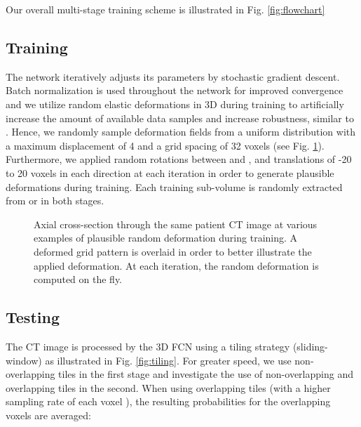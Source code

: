 \documentclass[authoryear]{elsarticle}
\begin{document}
\textcolor{revision}{Our overall multi-stage training scheme is illustrated in Fig. \ref{fig:flowchart}}
\begin{figure*}[htb] \centering
	\caption{\textcolor{revision}{Flowchart of our multi-stage cascaded training scheme.}}
	\label{fig:flowchart}
\end{figure*}
\subsection{Training}
The network iteratively adjusts its parameters by stochastic gradient descent. Batch normalization is used throughout the network for improved convergence and we utilize random elastic deformations in 3D during training to artificially increase the amount of available data samples and increase robustness, similar to \citep{cciccek20163d}. Hence, we randomly sample deformation fields from a uniform distribution with a maximum
displacement of 4 and a grid spacing of 32 voxels (see Fig. \ref{fig:deformations}). Furthermore, we applied random rotations between  and , and translations of -20 to 20 voxels in each direction at each iteration in order to generate plausible deformations during training. Each training sub-volume is randomly extracted from  or  in both stages. 
\begin{figure}[htb]
	\centering
\hfill
\hfill
\hfill
	\caption{Axial cross-section through the same patient CT image at various examples of plausible random deformation during training. A deformed grid pattern is overlaid in order to better illustrate the applied deformation. At each iteration, the random deformation is computed on the fly.}
	\label{fig:deformations}
\end{figure}
\subsection{Testing}
The CT image is processed by the 3D FCN using a tiling strategy (sliding-window) \citep{cciccek20163d} as illustrated in Fig. \ref{fig:tiling}. For greater speed, we use non-overlapping tiles in the first stage and investigate the use of non-overlapping and overlapping tiles in the second. When using overlapping tiles (with a  higher sampling rate of each voxel ), the resulting probabilities for the overlapping voxels are averaged: 
\end{document}
